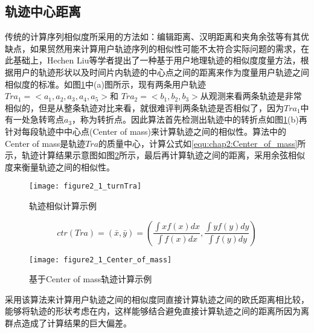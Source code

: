 \subsection{轨迹中心距离}
传统的计算序列相似度所采用的方法如：编辑距离、汉明距离和夹角余弦等有其优缺点，如果贸然用来计算用户轨迹序列的相似性可能不太符合实际问题的需求，在此基础上，Hechen Liu等学者提出了一种基于用户地理轨迹的相似度度量方法，根据用户的轨迹形状以及时间片内轨迹的中心点之间的距离来作为度量用户轨迹之间相似度的标准。如图\ref{fig:2_3_turn}中(a)图所示，现有两条用户轨迹$Tra_{1}=<a_{1},a_{2},a_{3},a_{4},a_{5}>$和
$Tra_{2}=<b_{1},b_{2},b_{3}>$从观测来看两条轨迹是非常相似的，但是从整条轨迹对比来看，就很难评判两条轨迹是否相似了，因为$Tra_{1}$中有一处急转弯点$a_{3}$，称为转折点。因此算法首先检测出轨迹中的转折点如图\ref{fig:2_3_turn}(b)再针对每段轨迹中中心点(Center of mass)来计算轨迹之间的相似性。算法中的Center of mass是轨迹$Tra$的质量中心，计算公式如\ref{equ:chap2:Center_of_mass}所示，轨迹计算结果示意图如图\ref{fig:2_3_Center_of_mass}所示，最后再计算轨迹之间的距离，采用余弦相似度来衡量轨迹之间的相似性。
\begin{figure}[htp]
\centering
\texttt{[image: figure2\_1\_turnTra]}
\caption{轨迹相似计算示例}
\label{fig:2_3_turn}
\end{figure}
\begin{equation}
\label{equ:chap2:Center_of_mass}
ctr(Tra)=(\bar{x},\bar{y})=(  \frac{\int x f(x)dx  }{\int f(x)dx},\frac{\int y f(y)dy  }{\int f(y)dy} )
\end{equation}
\begin{figure}[htp]
\centering
\texttt{[image: figure2\_1\_Center\_of\_mass]}
\caption{基于Center of mass轨迹计算示例}
\label{fig:2_3_Center_of_mass}
\end{figure}
\par 采用该算法来计算用户轨迹之间的相似度同直接计算轨迹之间的欧氏距离相比较，能够将轨迹的形状考虑在内，这样能够结合避免直接计算轨迹之间的距离所因为离群点造成了计算结果的巨大偏差。
